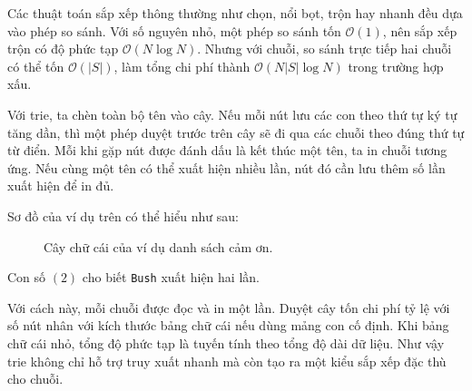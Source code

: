 \documentclass[11pt]{article}
\newcommand{\Oh}{\mathcal{O}}
\begin{document}
Các thuật toán sắp xếp thông thường như chọn, nổi bọt, trộn hay nhanh đều dựa
vào phép so sánh. Với số nguyên nhỏ, một phép so sánh tốn \(\Oh(1)\), nên sắp
xếp trộn có độ phức tạp \(\Oh(N\log N)\). Nhưng với chuỗi, so sánh trực tiếp
hai chuỗi có thể tốn \(\Oh(|S|)\), làm tổng chi phí thành
\(\Oh(N|S|\log N)\) trong trường hợp xấu.

Với trie, ta chèn toàn bộ tên vào cây. Nếu mỗi nút lưu các con theo thứ tự ký
tự tăng dần, thì một phép duyệt trước trên cây sẽ đi qua các chuỗi theo đúng
thứ tự từ điển. Mỗi khi gặp nút được đánh dấu là kết thúc một tên, ta in chuỗi
tương ứng. Nếu cùng một tên có thể xuất hiện nhiều lần, nút đó cần lưu thêm số
lần xuất hiện để in đủ.

Sơ đồ của ví dụ trên có thể hiểu như sau:
\begin{figure}[htbp]
\centering
{}
\caption{Cây chữ cái của ví dụ danh sách cảm ơn.}
\end{figure}
Con số \((2)\) cho biết \texttt{Bush} xuất hiện hai lần.

Với cách này, mỗi chuỗi được đọc và in một lần. Duyệt cây tốn chi phí tỷ lệ
với số nút nhân với kích thước bảng chữ cái nếu dùng mảng con cố định. Khi
bảng chữ cái nhỏ, tổng độ phức tạp là tuyến tính theo tổng độ dài dữ liệu.
Như vậy trie không chỉ hỗ trợ truy xuất nhanh mà còn tạo ra một kiểu sắp xếp
đặc thù cho chuỗi.
\end{document}
